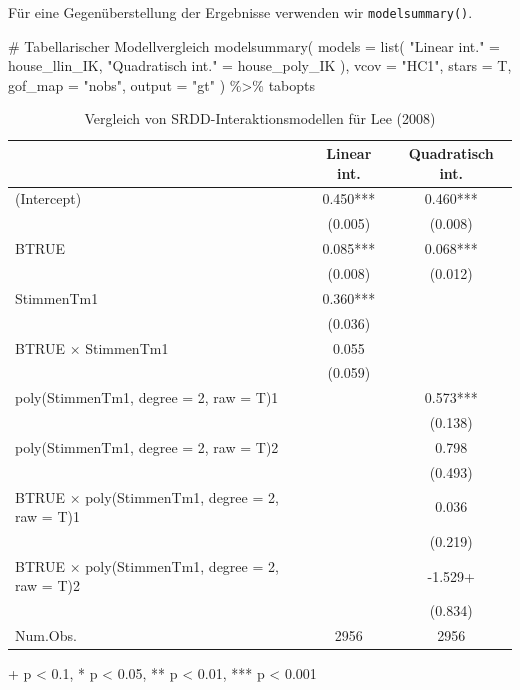 \documentclass[
  a4paper,
  DIV=11,
  oneside]{scrreprt}
\newenvironment{Shaded}{\begin{snugshade}}{\end{snugshade}}
\newcommand{\AttributeTok}[1]{\textcolor[rgb]{0.40,0.45,0.13}{#1}}
\newcommand{\CommentTok}[1]{\textcolor[rgb]{0.37,0.37,0.37}{#1}}
\newcommand{\FunctionTok}[1]{\textcolor[rgb]{0.28,0.35,0.67}{#1}}
\newcommand{\NormalTok}[1]{\textcolor[rgb]{0.00,0.23,0.31}{#1}}
\newcommand{\OtherTok}[1]{\textcolor[rgb]{0.00,0.23,0.31}{#1}}
\newcommand{\SpecialCharTok}[1]{\textcolor[rgb]{0.37,0.37,0.37}{#1}}
\newcommand{\StringTok}[1]{\textcolor[rgb]{0.13,0.47,0.30}{#1}}
\begin{document}
Für eine Gegenüberstellung der Ergebnisse verwenden wir
\texttt{modelsummary()}.

\begin{Shaded}
\begin{Highlighting}[]
\CommentTok{\# Tabellarischer Modellvergleich}
\FunctionTok{modelsummary}\NormalTok{(}
  \AttributeTok{models =} \FunctionTok{list}\NormalTok{(}
    \StringTok{"Linear int."} \OtherTok{=}\NormalTok{ house\_llin\_IK, }
    \StringTok{"Quadratisch int."} \OtherTok{=}\NormalTok{ house\_poly\_IK}
\NormalTok{  ),  }
  \AttributeTok{vcov =} \StringTok{"HC1"}\NormalTok{, }
  \AttributeTok{stars =}\NormalTok{ T,}
  \AttributeTok{gof\_map =} \StringTok{"nobs"}\NormalTok{, }
  \AttributeTok{output =} \StringTok{"gt"}
\NormalTok{) }\SpecialCharTok{\%\textgreater{}\%} 
\NormalTok{  tabopts}
\end{Highlighting}
\end{Shaded}

\hypertarget{tbl-intmodsLee}{}
\setlength{\LTpost}{0mm}
\begin{longtable}{lcc}
\caption{\label{tbl-intmodsLee}Vergleich von SRDD-Interaktionsmodellen für Lee (2008) }\tabularnewline

\toprule
  & Linear int. & Quadratisch int. \\ 
\midrule\addlinespace[2.5pt]
(Intercept) & 0.450*** & 0.460*** \\ 
 & (0.005) & (0.008) \\ 
BTRUE & 0.085*** & 0.068*** \\ 
 & (0.008) & (0.012) \\ 
StimmenTm1 & 0.360*** &  \\ 
 & (0.036) &  \\ 
BTRUE × StimmenTm1 & 0.055 &  \\ 
 & (0.059) &  \\ 
poly(StimmenTm1, degree = 2, raw = T)1 &  & 0.573*** \\ 
 &  & (0.138) \\ 
poly(StimmenTm1, degree = 2, raw = T)2 &  & 0.798 \\ 
 &  & (0.493) \\ 
BTRUE × poly(StimmenTm1, degree = 2, raw = T)1 &  & 0.036 \\ 
 &  & (0.219) \\ 
BTRUE × poly(StimmenTm1, degree = 2, raw = T)2 &  & -1.529+ \\ 
 &  & (0.834) \\ 
Num.Obs. & 2956 & 2956 \\ 
\bottomrule
\end{longtable}
\begin{minipage}{\linewidth}
+ p < 0.1, * p < 0.05, ** p < 0.01, *** p < 0.001\\
\end{minipage}
\end{document}
